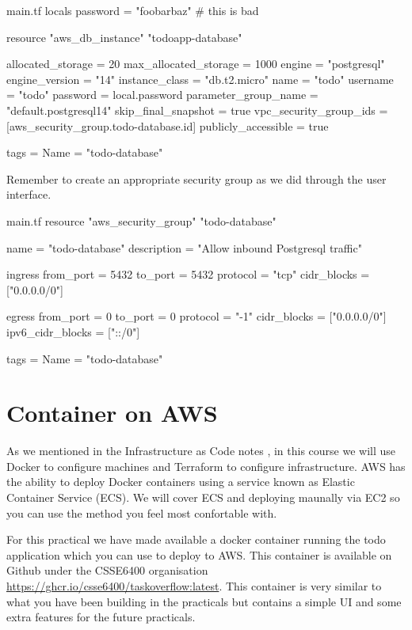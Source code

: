 \documentclass{csse4400}
\begin{document}
\begin{code}[language=terraform]{main.tf}
locals {
  password = "foobarbaz" # this is bad
}

resource "aws_db_instance" "todoapp-database" {
  allocated_storage      = 20
  max_allocated_storage  = 1000
  engine                 = "postgresql"
  engine_version         = "14"
  instance_class         = "db.t2.micro"
  name                   = "todo"
  username               = "todo"
  password               = local.password
  parameter_group_name   = "default.postgresql14"
  skip_final_snapshot    = true
  vpc_security_group_ids = [aws_security_group.todo-database.id]
  publicly_accessible    = true

  tags = {
    Name = "todo-database"
  }
}
\end{code}

\noindent Remember to create an appropriate security group as we did through the user interface.

\begin{code}[language=terraform]{main.tf}
resource "aws_security_group" "todo-database" {
  name        = "todo-database"
  description = "Allow inbound Postgresql traffic"

  ingress {
    from_port        = 5432
    to_port          = 5432
    protocol         = "tcp"
    cidr_blocks      = ["0.0.0.0/0"]
  }

  egress {
    from_port        = 0
    to_port          = 0
    protocol         = "-1"
    cidr_blocks      = ["0.0.0.0/0"]
    ipv6_cidr_blocks = ["::/0"]
  }

  tags = {
    Name = "todo-database"
  }
}
\end{code}

\section{Container on AWS}

As we mentioned in the Infrastructure as Code notes \cite{iac-notes},
in this course we will use Docker to configure machines and Terraform to configure infrastructure.
AWS has the ability to deploy Docker containers using a service known as Elastic Container Service (ECS). We will cover ECS and deploying maunally via EC2 so you can use the method you feel most confortable with.

For this practical we have made available a docker container running the todo application which you can use to deploy to AWS. This container is available on Github under the CSSE6400 organisation \url{https://ghcr.io/csse6400/taskoverflow:latest}. This container is very similar to what you have been building in the practicals but contains a simple UI and some extra features for the future practicals.
\end{document}
